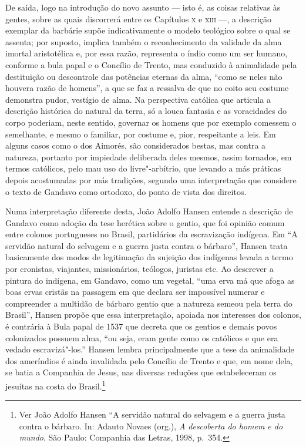De saída, logo na introdução do novo assunto --- isto é, as coisas
relativas às gentes, sobre as quais discorrerá entre os Capítulos \textsc{x} e
\textsc{xiii} ---, a descrição exemplar da barbárie supõe indicativamente o modelo
teológico sobre o qual se assenta; por suposto, implica também o
reconhecimento da validade da alma imortal aristotélica e, por essa
razão, representa o índio como um ser humano, conforme a bula papal e o
Concílio de Trento, mas conduzido à animalidade pela destituição ou
descontrole das potências eternas da alma, ``como se neles
não houvera razão de homens'', a que se faz a ressalva de
que no coito seu costume demonstra pudor, vestígio de alma. Na
perspectiva católica que articula a descrição histórica do natural da
terra, só a louca fantasia e as voracidades do corpo poderiam, neste
sentido, governar os homens que por exemplo comessem o semelhante, e
mesmo o familiar, por costume e, pior, respeitante a leis. Em alguns
casos como o dos Aimorés, são considerados bestas, mas contra a
natureza, portanto por impiedade deliberada deles mesmos, assim
tornados, em termos católicos, pelo mau uso do livre"-arbítrio, que
levando a más práticas depois acostumadas por más tradições, segundo
uma interpretação que considere o texto de Gandavo como ortodoxo, do
ponto de vista dos direitos.

Numa interpretação diferente desta, João Adolfo Hansen entende a
descrição de Gandavo como adoção da tese herética sobre o gentio, que
foi opinião comum entre colonos portugueses no Brasil, partidários da
escravização indígena. Em ``A servidão natural do selvagem
e a guerra justa contra o bárbaro'', Hansen trata
basicamente dos modos de legitimação da sujeição dos indígenas levada a
termo por cronistas, viajantes, missionários, teólogos, juristas etc.
Ao descrever a pintura do indígena, em Gandavo, como um vegetal,
``uma erva má que afoga as boas ervas cristãs na passagem
em que declara ser impossível numerar e compreender a multidão de
bárbaro gentio que a natureza semeou pela terra do
Brasil'', Hansen propõe que essa interpretação, apoiada
nos interesses dos colonos, é contrária à Bula papal de 1537 que
decreta que os gentios e demais povos colonizados possuem alma,
``ou seja, eram gente como os católicos e que era vedado
escravizá"-los.'' Hansen lembra principalmente que a tese
da animalidade dos ameríndios é ainda invalidada pelo Concílio de
Trento e que, em nome dela, se batia a Companhia de Jesus, nas diversas
reduções que estabeleceram os jesuítas na costa do Brasil.\footnote{ Ver João 
Adolfo Hansen ``A servidão natural do selvagem e
a guerra justa contra o bárbaro. In: Adauto Novaes (org.), \textit{A descoberta
do homem e do mundo}. São Paulo: Companhia das Letras, 1998, p.~354.}

